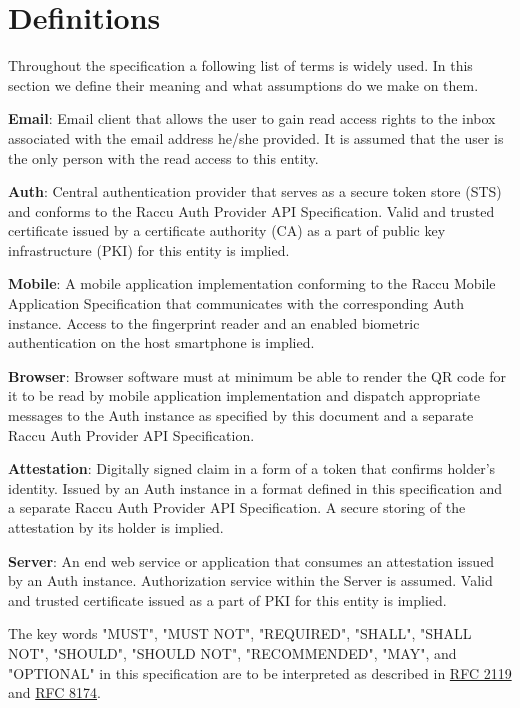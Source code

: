\section{Definitions}
Throughout the specification a following list of terms is widely used. In this section we define their meaning 
and what assumptions do we make on them.

\medskip
\textbf{Email}: Email client that allows the user to gain read access rights to the inbox associated
with the email address he/she provided. It is assumed that the user is the only person with the read access 
to this entity.

\medskip
\textbf{Auth}: Central authentication provider that serves as a secure token store (STS) and conforms to 
the Raccu Auth Provider API Specification. Valid and trusted certificate issued by a certificate authority
(CA) as a part of public key infrastructure (PKI) for this entity is implied.

\medskip
\textbf{Mobile}: A mobile application implementation conforming to the Raccu Mobile Application Specification 
that communicates with the corresponding Auth instance. Access to the fingerprint reader and an enabled biometric 
authentication on the host smartphone is implied.

\medskip
\textbf{Browser}: Browser software must at minimum be able to render the QR code for it to be read by mobile 
application implementation and dispatch appropriate messages to the Auth instance as specified by this document 
and a separate Raccu Auth Provider API Specification. 

\medskip
\textbf{Attestation}: Digitally signed claim in a form of a token that confirms holder's identity. Issued by 
an Auth instance in a format defined in this specification and a separate Raccu Auth Provider API Specification. 
A secure storing of the attestation by its holder is implied.

\medskip
\textbf{Server}: An end web service or application that consumes an attestation issued by an Auth instance. 
Authorization service within the Server is assumed. Valid and trusted certificate issued as a part of PKI 
for this entity is implied.

\medskip
The key words "MUST", "MUST NOT", "REQUIRED", "SHALL", "SHALL NOT", "SHOULD", "SHOULD NOT", "RECOMMENDED", 
"MAY", and "OPTIONAL" in this specification are to be interpreted as described in 
\href{https://tools.ietf.org/html/rfc2119}{RFC 2119} and \href{https://tools.ietf.org/html/rfc8174}{RFC 8174}.